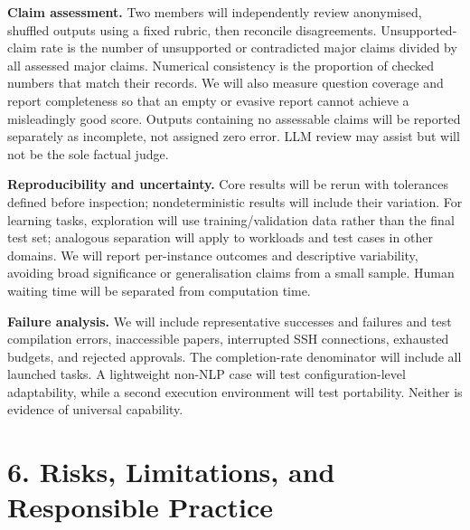 \documentclass[11pt]{article}
\begin{document}
\noindent\textbf{Claim assessment.} Two members will independently review anonymised, shuffled outputs using a fixed rubric, then reconcile disagreements. Unsupported-claim rate is the number of unsupported or contradicted major claims divided by all assessed major claims. Numerical consistency is the proportion of checked numbers that match their records. We will also measure question coverage and report completeness so that an empty or evasive report cannot achieve a misleadingly good score. Outputs containing no assessable claims will be reported separately as incomplete, not assigned zero error. LLM review may assist but will not be the sole factual judge.

\noindent\textbf{Reproducibility and uncertainty.} Core results will be rerun with tolerances defined before inspection; nondeterministic results will include their variation. For learning tasks, exploration will use training/validation data rather than the final test set; analogous separation will apply to workloads and test cases in other domains. We will report per-instance outcomes and descriptive variability, avoiding broad significance or generalisation claims from a small sample. Human waiting time will be separated from computation time.

\noindent\textbf{Failure analysis.} We will include representative successes and failures and test compilation errors, inaccessible papers, interrupted SSH connections, exhausted budgets, and rejected approvals. The completion-rate denominator will include all launched tasks. A lightweight non-NLP case will test configuration-level adaptability, while a second execution environment will test portability. Neither is evidence of universal capability.

\section*{6. Risks, Limitations, and Responsible Practice}
\end{document}
